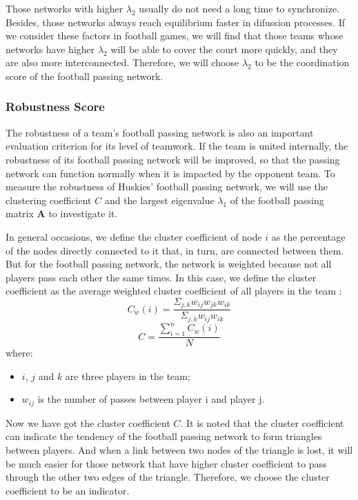 \documentclass{mcmthesis}
\begin{document}
	Those networks with higher  $\lambda_{2}$ usually do not need a long time to synchronize. Besides, those networks always reach equilibrium faster in difussion processes.  If we consider these factors in football games, we will find that those teams whose networks have higher $\lambda_{2}$ will be able to cover the court more quickly, and they are also more interconnected.  Therefore, we will choose $\lambda_{2}$ to be the coordination score of the football passing network.
\subsubsection{Robustness Score}
	The robustness of a team's football passing network is also an important evaluation criterion for its level of teamwork.  If the team is united internally, the robustness of its football passing network will be improved, so that the passing network can function normally when it is impacted by the opponent team.  To measure the robustness of Huskies' football passing network, we will use the clustering coefficient $C$ and the largest eigenvalue $\lambda_{1}$ of the football passing matrix $\textbf{A}$ to investigate it.  

	In general occasions, we define the cluster coefficient of node $i$ as the percentage of the nodes directly connected to it that, in turn, are connected between them.  But for the football passing network, the network is weighted because not all players pass each other the same times.  In this case, we define the cluster coefficient as the average weighted cluster coefficient of all players in the team :
	\begin{equation}\label{eq:cwi}
		C_{w}(i) = \frac{\Sigma_{j,k}w_{ij}w_{jk}w_{ik}}{\Sigma_{j,k}w_{ij}w_{ik}}
	\end{equation}
	\begin{equation}\label{eq:c}
		C = \frac{\sum_{i=1}^n C_{w}(i)}{N}
	\end{equation}
	where:
	\begin{itemize}
	\item $i$, $j$ and $k$ are three players in the team;
	\item 	$w_{ij}$ is the number of passes between player i and player j.
	\end{itemize}	
	
	Now we have got the cluster coefficient $C$. It is noted that the cluster coefficient can indicate the tendency of the football passing network to form triangles between players.  And when a link between two nodes of the triangle is lost, it will be much easier for those network that have higher cluster coefficient to pass through the other two edges of the triangle.  Therefore, we choose the cluster coefficient to be an indicator.
\end{document}
